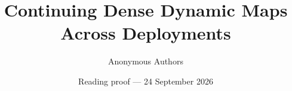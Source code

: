 \documentclass[10pt,twocolumn,letterpaper]{article}
\title{Continuing Dense Dynamic Maps Across Deployments}
\author{Anonymous Authors}
\date{\small Reading proof --- 24 September 2026}
\begin{document}
\raggedbottom
\maketitle







{\small}
\end{document}
